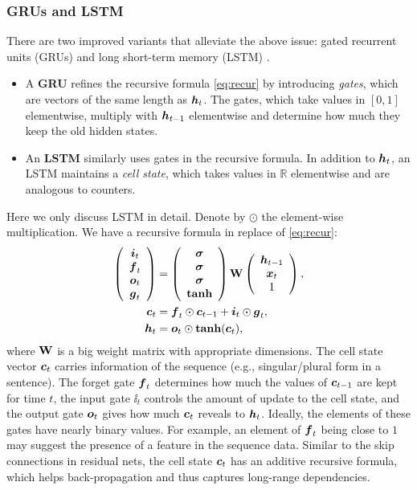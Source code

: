 \subsubsection{GRUs and LSTM} There are two improved variants that alleviate the above issue: gated recurrent units (GRUs) \citep{cho2014learning} and long short-term memory (LSTM) \citep{hochreiter1997long}.
\begin{itemize}
\item{ A \textbf{GRU} refines the recursive formula \eqref{eq:recur} by introducing \textit{gates}, which are vectors of the same length as $\text{\boldmath $h$}_t$. The gates, which take values in $[0,1]$ elementwise, multiply with $\text{\boldmath $h$}_{t-1}$ elementwise and determine how much they keep the old hidden states.
}
\item{ An \textbf{LSTM} similarly uses gates in the recursive formula. In addition to $\text{\boldmath $h$}_t$, an LSTM maintains a \textit{cell state}, which takes values in $\mathbb{R}$ elementwise and are analogous to counters.
}
\end{itemize}
Here we only discuss LSTM in detail. Denote by $\odot$ the element-wise multiplication. We have a recursive formula in replace of \eqref{eq:recur}:
\begin{align*}
\left( \begin{array}{c} \text{\boldmath $i$}_t \\ \text{\boldmath $f$}_t \\ \text{\boldmath $o$}_t \\ \text{\boldmath $g$}_t \end{array} \right) &= \left( \begin{array}{c} \bm{\sigma} \\ \bm{\sigma} \\ \bm{\sigma} \\ \mathrm{\textbf{tanh}} \end{array} \right) \mathrm{\bf W} \left( \begin{array}{c} \text{\boldmath $h$}_{t-1} \\ \text{\boldmath $x$}_t \\ 1 \end{array} \right), \\
\text{\boldmath $c$}_t &= \text{\boldmath $f$}_t \odot \text{\boldmath $c$}_{t-1} + \text{\boldmath $i$}_t \odot \text{\boldmath $g$}_t, \\
\text{\boldmath $h$}_t &= \text{\boldmath $o$}_t \odot \mathrm{\textbf{tanh}}(\text{\boldmath $c$}_t),
\end{align*}
where $\mathrm{\bf W}$ is a big weight matrix with appropriate dimensions. The cell state vector $\text{\boldmath $c$}_t$ carries information of the sequence (e.g., singular/plural form in a sentence). The forget gate $\text{\boldmath $f$}_t$ determines how much the values of $\text{\boldmath $c$}_{t-1}$ are kept for time $t$, the input gate $\ii_t$ controls the amount of update to the cell state, and the output gate $\text{\boldmath $o$}_t$ gives how much $\text{\boldmath $c$}_t$ reveals to $\text{\boldmath $h$}_t$.  Ideally, the elements of these gates have nearly binary values. For example, an element of $\text{\boldmath $f$}_t$ being close to $1$ may suggest the presence of a feature in the sequence data. Similar to the skip connections in residual nets, the cell state $\text{\boldmath $c$}_t$ has an additive recursive formula, which helps back-propagation and thus captures long-range dependencies.

